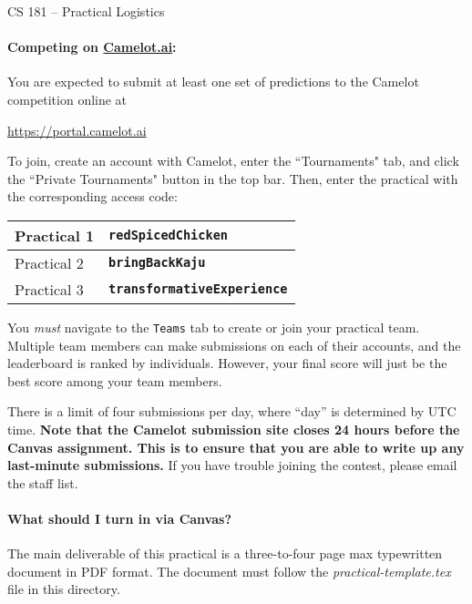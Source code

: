 \documentclass[12pt,letterpaper]{article}
\begin{document}
\begin{center}
  {\large CS 181 -- Practical Logistics}
\end{center}


\paragraph{Competing on \href{https://camelot.ai}{Camelot.ai}:} You are expected to submit at least one set of predictions to the Camelot competition online at
	\begin{center}
		\href{https://portal.camelot.ai}{https://portal.camelot.ai}
	\end{center}

	To join, create an account with Camelot, enter the ``Tournaments" tab, and click the ``Private Tournaments" button in the top bar. Then, enter the practical with the corresponding access code:

\begin{center}
\begin{tabular}{l|l}
Practical 1 & \textbf{\texttt{redSpicedChicken}}\\
\hline
Practical 2 & \textbf{\texttt{bringBackKaju}}\\
\hline
Practical 3 & \textbf{\texttt{transformativeExperience}}
\end{tabular}
\end{center}

You \emph{must} navigate to the \texttt{Teams} tab to create or join your practical team. Multiple team members can make submissions on each of their accounts, and the leaderboard is ranked by individuals. However, your final score will just be the best score among your team members. 

There is a limit of four submissions per day, where ``day'' is determined by UTC time.  \textbf{Note that the Camelot submission site closes 24 hours before the Canvas assignment.  This is to ensure that you are able to write up any last-minute submissions.} If you have trouble joining the contest, please email the staff list.



\paragraph{What should I turn in via Canvas?}

The main deliverable of this practical is a three-to-four page max
typewritten document in PDF format.  The document must follow the
\textit{practical-template.tex} file in this directory.
\end{document}
